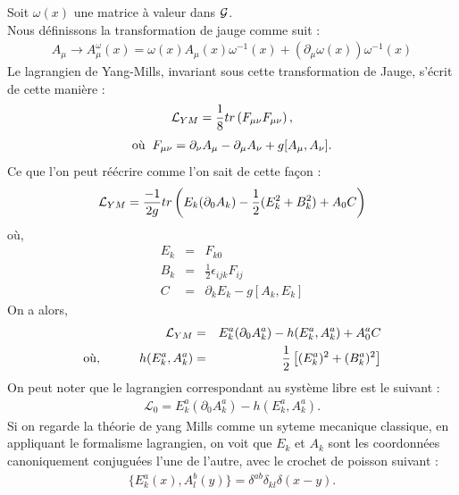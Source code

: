 \documentclass[a4paper,11pt]{article} %
\theoremstyle{plain}
\theoremstyle{definition}
\theoremstyle{remark}
\numberwithin{equation}{section}
\numberwithin{equation}{subsection}
\numberwithin{figure}{section}
\begin{document}
\noindent
Soit $\omega(x)$ une matrice à valeur dans $\cal{G}$.\\
Nous définissons la transformation de jauge comme suit :
\begin{eqnarray*}
 A_{\mu} \rightarrow  A^{\omega}_{\mu}(x)=\omega(x)A_{\mu}(x)\omega^{-1}(x) + ( \partial_{\mu} \omega(x) ) \omega^{-1}(x)
\end{eqnarray*}
Le lagrangien de Yang-Mills, invariant sous cette transformation de Jauge, s'écrit de cette manière : 
\begin{eqnarray*}
\mathcal{L}_{\small YM} = \frac{1}{8} tr\left(F_{\mu\nu}F_{\mu \nu}\right),
\end{eqnarray*}
\begin{eqnarray*}
\text{où} \hspace{2mm} F_{\mu \nu}=\partial_{\nu}A_{\mu} - \partial_{\mu}A_{\nu} + g[A_{\mu},A_{\nu}].
\end{eqnarray*}
Ce que l'on peut réécrire comme l'on sait de cette façon :
\begin{eqnarray*}
\mathcal{L}_{\small YM} = \frac{-1}{2g} tr\left( E_{k}(\partial_{0} A_{k}) - \frac{1}{2}(E_{k}^{2} + B_{k}^2) + A_{0}C\right)
\end{eqnarray*}
où, 
\begin{eqnarray*}
 E_k &=& F_{k0}\\
 B_k &=& \frac{1}{2} \epsilon_{ijk} F_{ij}\\
   C &=& \partial_{k} E_{k} - g[A_k , E_k] 
\end{eqnarray*}
On a alors,
\begin{eqnarray*}
 \mathcal{L}_{\small YM} &=& E_{k}^{a}(\partial_{0} A_{k}^{a}) - h(E_{k}^{a},A_{k}^{a}) + A_{0}^{a}C\\
 \text{où, \hspace{1cm}} h(E_{k}^{a},A_{k}^{a}) &=& \frac{1}{2}\left[(E_{k}^{a})^{2} + (B_{k}^{a})^2 \right]
\end{eqnarray*}
On peut noter que le lagrangien correspondant au système libre est le suivant :
\begin{eqnarray*}
 \mathcal{L}_{0} = E_{k}^{a}(\partial_{0} A_{k}^{a}) - h(E_{k}^{a},A_{k}^{a}).
\end{eqnarray*}
Si on regarde la théorie de yang Mills comme un syteme mecanique classique, en appliquant le formalisme lagrangien, on voit que $E_{k}$ et $A_{k}$ sont les coordonnées canoniquement conjuguées l'une de l'autre, avec le crochet de poisson suivant :
\begin{eqnarray*}
  \{ E_{k}^{a}(x) , A_{l}^{b}(y) \} = \delta^{ab} \delta_{kl} \delta(x-y).
\end{eqnarray*}
\end{document}

